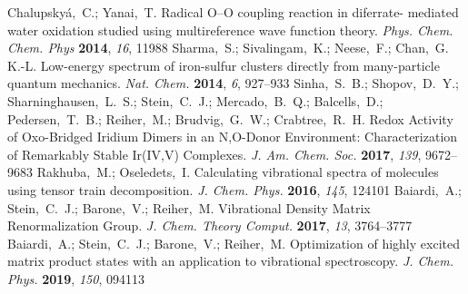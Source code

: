 \documentclass[journal=jctcce]{achemso}
\begin{document}
\begin{mcitethebibliography}{79}
  Chalupsky{\'{a}},~C.; Yanai,~T. {Radical O–O coupling reaction in
  diferrate- mediated water oxidation studied using multireference wave
  function theory}. \emph{Phys. Chem. Chem. Phys} \textbf{2014}, \emph{16},
  11988\relax
\mciteBstWouldAddEndPuncttrue
\mciteSetBstMidEndSepPunct{\mcitedefaultmidpunct}
{\mcitedefaultendpunct}{\mcitedefaultseppunct}\relax
\EndOfBibitem
{}
Sharma,~S.; Sivalingam,~K.; Neese,~F.; Chan,~G. K.-L. {Low-energy spectrum of
  iron-sulfur clusters directly from many-particle quantum mechanics}.
  \emph{Nat. Chem.} \textbf{2014}, \emph{6}, 927--933\relax
\mciteBstWouldAddEndPuncttrue
\mciteSetBstMidEndSepPunct{\mcitedefaultmidpunct}
{\mcitedefaultendpunct}{\mcitedefaultseppunct}\relax
\EndOfBibitem
{}
Sinha,~S.~B.; Shopov,~D.~Y.; Sharninghausen,~L.~S.; Stein,~C.~J.;
  Mercado,~B.~Q.; Balcells,~D.; Pedersen,~T.~B.; Reiher,~M.; Brudvig,~G.~W.;
  Crabtree,~R.~H. {Redox Activity of Oxo-Bridged Iridium Dimers in an N,O-Donor
  Environment: Characterization of Remarkably Stable Ir(IV,V) Complexes}.
  \emph{J. Am. Chem. Soc.} \textbf{2017}, \emph{139}, 9672--9683\relax
\mciteBstWouldAddEndPuncttrue
\mciteSetBstMidEndSepPunct{\mcitedefaultmidpunct}
{\mcitedefaultendpunct}{\mcitedefaultseppunct}\relax
\EndOfBibitem
{}
Rakhuba,~M.; Oseledets,~I. {Calculating vibrational spectra of molecules using
  tensor train decomposition}. \emph{J. Chem. Phys.} \textbf{2016}, \emph{145},
  124101\relax
\mciteBstWouldAddEndPuncttrue
\mciteSetBstMidEndSepPunct{\mcitedefaultmidpunct}
{\mcitedefaultendpunct}{\mcitedefaultseppunct}\relax
\EndOfBibitem
{}
Baiardi,~A.; Stein,~C.~J.; Barone,~V.; Reiher,~M. {Vibrational Density Matrix
  Renormalization Group}. \emph{J. Chem. Theory Comput.} \textbf{2017},
  \emph{13}, 3764--3777\relax
\mciteBstWouldAddEndPuncttrue
\mciteSetBstMidEndSepPunct{\mcitedefaultmidpunct}
{\mcitedefaultendpunct}{\mcitedefaultseppunct}\relax
\EndOfBibitem
{}
Baiardi,~A.; Stein,~C.~J.; Barone,~V.; Reiher,~M. {Optimization of highly
  excited matrix product states with an application to vibrational
  spectroscopy}. \emph{J. Chem. Phys.} \textbf{2019}, \emph{150}, 094113\relax

\end{mcitethebibliography}
\end{document}
